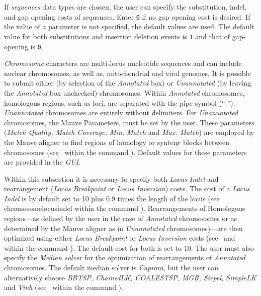 \begin{description}
\setlength{\labelsep}{5pt}
\setlength{\itemindent}{0pt}%
\setlength{\parindent}{0.5cm}        

\item [Sequence Parameters]  If \emph{sequences} data types are chosen, the user can specify the 
substitution, indel, and gap opening costs of sequences. Enter \texttt{0} if no gap opening 
cost is desired. If the value of a parameter is not specified, the default values are used. 
The default value for both substitutions and insertion deletion events is \texttt{1} and 
that of gap-opening is \texttt{0}. 

\item [Chromosome and Mauve Parameters] \emph{Chromosome} characters are multi-locus 
nucleotide sequences and can include nuclear chromosomes, as well as, mitochondrial 
and viral genomes.  It is possible to submit either  (by selection of the 
\emph{Annotated} box) or \emph{Unannotated} (by leaving the \emph{Annotated} box 
unchecked) chromosomes. Within \emph{Annotated} 
chromosomes, homologous regions, such as loci, are separated with the pipe symbol
(``$\vert$'').  \emph{Unannotated} chromosomes are entirely 
without delimiters. For \emph{Unannotated} chromosomes, the Mauve Parameters, must be set
by the user.  These parameters (\emph{Match Quality, Match Coverage, Min. Match} and \emph {Max. Match}) 
are employed by the Mauve aligner to find regions of homology or synteny blocks 
between chromosomes (see~ within the 
command ). Default values for these parameters are provided in the \emph{GUI}.

\indent Within this subsection it is necessary to specify both \emph{Locus Indel} and rearrangement 
(\emph{Locus Breakpoint} or \emph{Locus Inversion}) costs.  The cost of a \emph{Locus Indel} 
is by default set to 10 plus 0.9 times the length of the locus (see~
{chromosomelocusindel}  within the command ). 
Rearrangements of Homologous regions---as defined by the user in the case of \emph{Annotated} chromosomes 
or as determined by the Mauve aligner as in \emph{Unannotated} chromosomes)---are 
then optimized using either \emph{Locus Breakpoint} or \emph{Locus Inversion} costs 
(see~ and
~ within the command 
).  The default cost for both is set to 10. The user must also specify the 
\emph{Median solver} for the optimization of rearrangements of \emph{Annotated} chromosomes. 
The default median solver is \emph{Caprara}, but the user can alternatively choose \emph{BBTSP, 
ChainedLK, COALESTSP, 	MGR, Siepel, SimpleLK} and \emph{Vinh} 
(see~ within the command ).


\end{description}
